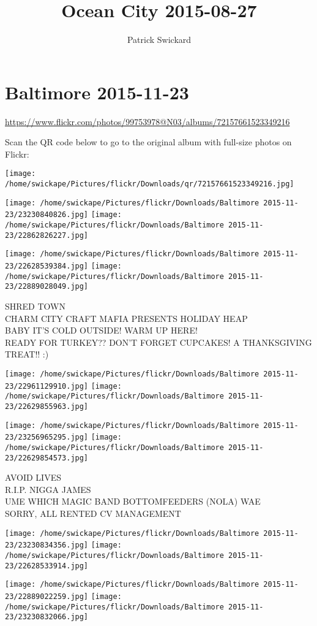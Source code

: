 \documentclass[10pt,letterpaper]{article}
\title{Ocean City 2015-08-27}
\author{Patrick Swickard}
\date{}
\begin{document}
\section*{Baltimore 2015-11-23}

\url{https://www.flickr.com/photos/99753978@N03/albums/72157661523349216}

Scan the QR code below to go to the original album with full-size photos on Flickr:

\texttt{[image: /home/swickape/Pictures/flickr/Downloads/qr/72157661523349216.jpg]}
\pagebreak

\texttt{[image: /home/swickape/Pictures/flickr/Downloads/Baltimore 2015-11-23/23230840826.jpg]}
\texttt{[image: /home/swickape/Pictures/flickr/Downloads/Baltimore 2015-11-23/22862826227.jpg]}

\texttt{[image: /home/swickape/Pictures/flickr/Downloads/Baltimore 2015-11-23/22628539384.jpg]}
\texttt{[image: /home/swickape/Pictures/flickr/Downloads/Baltimore 2015-11-23/22889028049.jpg]}

SHRED TOWN\\
CHARM CITY CRAFT MAFIA PRESENTS HOLIDAY HEAP\\
BABY IT'S COLD OUTSIDE!  WARM UP HERE!\\
READY FOR TURKEY??  DON'T FORGET CUPCAKES!  A THANKSGIVING TREAT!! :)
\pagebreak

\texttt{[image: /home/swickape/Pictures/flickr/Downloads/Baltimore 2015-11-23/22961129910.jpg]}
\texttt{[image: /home/swickape/Pictures/flickr/Downloads/Baltimore 2015-11-23/22629855963.jpg]}

\texttt{[image: /home/swickape/Pictures/flickr/Downloads/Baltimore 2015-11-23/23256965295.jpg]}
\texttt{[image: /home/swickape/Pictures/flickr/Downloads/Baltimore 2015-11-23/22629854573.jpg]}

AVOID LIVES\\
R.I.P. NIGGA JAMES\\
UME WHICH MAGIC BAND BOTTOMFEEDERS (NOLA) WAE\\
SORRY, ALL RENTED CV MANAGEMENT
\pagebreak

\texttt{[image: /home/swickape/Pictures/flickr/Downloads/Baltimore 2015-11-23/23230834356.jpg]}
\texttt{[image: /home/swickape/Pictures/flickr/Downloads/Baltimore 2015-11-23/22628533914.jpg]}

\texttt{[image: /home/swickape/Pictures/flickr/Downloads/Baltimore 2015-11-23/22889022259.jpg]}
\texttt{[image: /home/swickape/Pictures/flickr/Downloads/Baltimore 2015-11-23/23230832066.jpg]}
\end{document}
